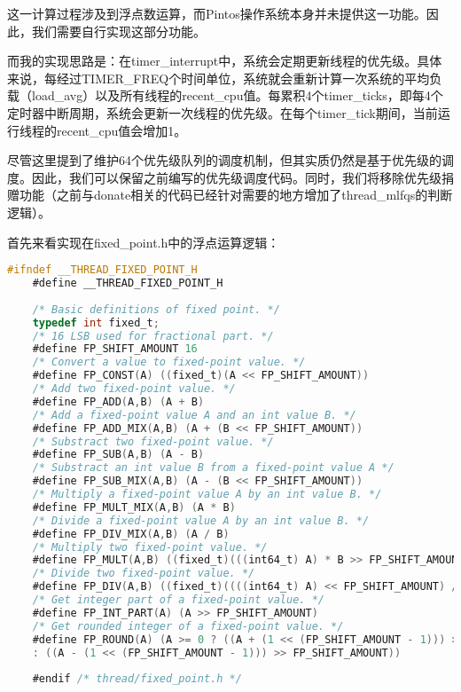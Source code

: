 \documentclass{article}
\begin{document}
	这一计算过程涉及到浮点数运算，而Pintos操作系统本身并未提供这一功能。因此，我们需要自行实现这部分功能。
	
	而我的实现思路是：在timer\_interrupt中，系统会定期更新线程的优先级。具体来说，每经过TIMER\_FREQ个时间单位，系统就会重新计算一次系统的平均负载（load\_avg）以及所有线程的recent\_cpu值。每累积4个timer\_ticks，即每4个定时器中断周期，系统会更新一次线程的优先级。在每个timer\_tick期间，当前运行线程的recent\_cpu值会增加1。
	
	尽管这里提到了维护64个优先级队列的调度机制，但其实质仍然是基于优先级的调度。因此，我们可以保留之前编写的优先级调度代码。同时，我们将移除优先级捐赠功能（之前与donate相关的代码已经针对需要的地方增加了thread\_mlfqs的判断逻辑）。
	
	首先来看实现在fixed\_point.h中的浮点运算逻辑：
	
	\begin{lstlisting}[language=C, title=fixed\_point.h]
    #ifndef __THREAD_FIXED_POINT_H
    #define __THREAD_FIXED_POINT_H
    
    /* Basic definitions of fixed point. */
    typedef int fixed_t;
    /* 16 LSB used for fractional part. */
    #define FP_SHIFT_AMOUNT 16
    /* Convert a value to fixed-point value. */
    #define FP_CONST(A) ((fixed_t)(A << FP_SHIFT_AMOUNT))
    /* Add two fixed-point value. */
    #define FP_ADD(A,B) (A + B)
    /* Add a fixed-point value A and an int value B. */
    #define FP_ADD_MIX(A,B) (A + (B << FP_SHIFT_AMOUNT))
    /* Substract two fixed-point value. */
    #define FP_SUB(A,B) (A - B)
    /* Substract an int value B from a fixed-point value A */
    #define FP_SUB_MIX(A,B) (A - (B << FP_SHIFT_AMOUNT))
    /* Multiply a fixed-point value A by an int value B. */
    #define FP_MULT_MIX(A,B) (A * B)
    /* Divide a fixed-point value A by an int value B. */
    #define FP_DIV_MIX(A,B) (A / B)
    /* Multiply two fixed-point value. */
    #define FP_MULT(A,B) ((fixed_t)(((int64_t) A) * B >> FP_SHIFT_AMOUNT))
    /* Divide two fixed-point value. */
    #define FP_DIV(A,B) ((fixed_t)((((int64_t) A) << FP_SHIFT_AMOUNT) / B))
    /* Get integer part of a fixed-point value. */
    #define FP_INT_PART(A) (A >> FP_SHIFT_AMOUNT)
    /* Get rounded integer of a fixed-point value. */
    #define FP_ROUND(A) (A >= 0 ? ((A + (1 << (FP_SHIFT_AMOUNT - 1))) >> FP_SHIFT_AMOUNT) \
    : ((A - (1 << (FP_SHIFT_AMOUNT - 1))) >> FP_SHIFT_AMOUNT))
    
    #endif /* thread/fixed_point.h */
	\end{lstlisting}
	
\end{document}
